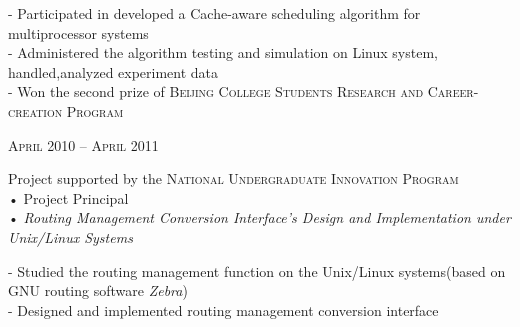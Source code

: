 \documentclass[10pt,a4paper]{article} %
\begin{document}
\begin{minipage}[t]{0.5\textwidth}
\normalsize{
-  Participated in developed  a Cache-aware scheduling algorithm for multiprocessor systems\\
-  Administered the algorithm testing and simulation on Linux system, handled,analyzed experiment data\\
-  Won the second prize of \textsc{Beijing College Students Research and Career-creation Program}
}\\

{\raggedleft\textsc{April 2010 -- April 2011}\par}

{\raggedright Project supported by the \textsc{National Undergraduate Innovation Program } \\
 • Project Principal\\
 • \textit{Routing Management Conversion Interface’s Design and
Implementation under Unix/Linux Systems}\\}

\normalsize{
-  Studied the routing management function on the Unix/Linux systems(based on GNU routing software \textit{Zebra})\\
-  Designed and implemented routing management conversion interface\\
}\\



\end{minipage} %
\hfill
\end{document}
